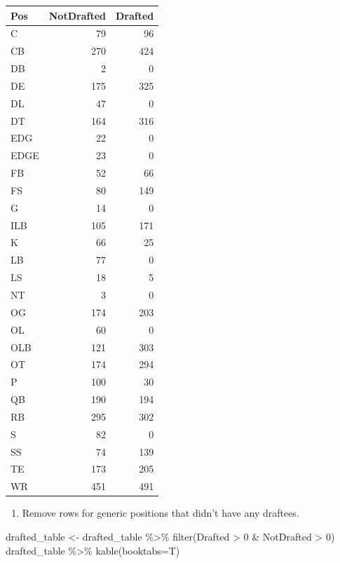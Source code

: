 \documentclass[
  11pt,
]{book}
\newenvironment{Shaded}{\begin{snugshade}}{\end{snugshade}}
\newcommand{\AttributeTok}[1]{\textcolor[rgb]{0.77,0.63,0.00}{#1}}
\newcommand{\DecValTok}[1]{\textcolor[rgb]{0.00,0.00,0.81}{#1}}
\newcommand{\FunctionTok}[1]{\textcolor[rgb]{0.00,0.00,0.00}{#1}}
\newcommand{\NormalTok}[1]{#1}
\newcommand{\OtherTok}[1]{\textcolor[rgb]{0.56,0.35,0.01}{#1}}
\newcommand{\SpecialCharTok}[1]{\textcolor[rgb]{0.00,0.00,0.00}{#1}}
\providecommand{\tightlist}{%
  \setlength{\itemsep}{0pt}\setlength{\parskip}{0pt}}
\theoremstyle{definition}
\theoremstyle{definition}
\theoremstyle{definition}
\theoremstyle{definition}
\theoremstyle{remark}
\begin{document}
\begin{tabular}{lrr}
\toprule
Pos & NotDrafted & Drafted\\
\midrule
C & 79 & 96\\
CB & 270 & 424\\
DB & 2 & 0\\
DE & 175 & 325\\
DL & 47 & 0\\
\addlinespace
DT & 164 & 316\\
EDG & 22 & 0\\
EDGE & 23 & 0\\
FB & 52 & 66\\
FS & 80 & 149\\
\addlinespace
G & 14 & 0\\
ILB & 105 & 171\\
K & 66 & 25\\
LB & 77 & 0\\
LS & 18 & 5\\
\addlinespace
NT & 3 & 0\\
OG & 174 & 203\\
OL & 60 & 0\\
OLB & 121 & 303\\
OT & 174 & 294\\
\addlinespace
P & 100 & 30\\
QB & 190 & 194\\
RB & 295 & 302\\
S & 82 & 0\\
SS & 74 & 139\\
\addlinespace
TE & 173 & 205\\
WR & 451 & 491\\
\bottomrule
\end{tabular}

\newpage

\begin{enumerate}
\def\labelenumi{(\alph{enumi})}
\setcounter{enumi}{2}
\tightlist
\item
  Remove rows for generic positions that didn't have any draftees.
\end{enumerate}

\begin{Shaded}
\begin{Highlighting}[]
\NormalTok{drafted\_table }\OtherTok{\textless{}{-}}\NormalTok{ drafted\_table }\SpecialCharTok{\%\textgreater{}\%} \FunctionTok{filter}\NormalTok{(Drafted }\SpecialCharTok{\textgreater{}} \DecValTok{0} \SpecialCharTok{\&}\NormalTok{ NotDrafted }\SpecialCharTok{\textgreater{}} \DecValTok{0}\NormalTok{)}
\NormalTok{drafted\_table }\SpecialCharTok{\%\textgreater{}\%} \FunctionTok{kable}\NormalTok{(}\AttributeTok{booktabs=}\NormalTok{T)}
\end{Highlighting}
\end{Shaded}
\end{document}
